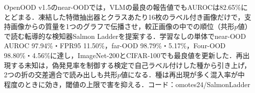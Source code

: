 OpenOOD v1.5のnear-OODでは，VLMの最良の報告値でもAUROCは82.65\%にとどまる．凍結した特徴抽出器とクラスあたり16枚のラベル付き画像だけで，支持画像からの質量を1つのグラフで伝播させ，較正画像の中での順位（共形$p$値）で読む転導的な検知器Salmon Ladderを提案する．学習なしの単体でnear-OOD AUROC 97.94\%・FPR95 11.50\%，far-OOD 98.79\%・5.17\%，Four-OOD 98.80\%・4.56\%に達し，ImageNet-200とCIFAR-100でも最良値を更新した．再出現する未知は，偽発見率を制御する検定で自己ラベル付けした種から引き上げ，2つの折の交差適合で読み出しも共形$p$値になる．種は再出現が多く混入率が中程度のときに効き，閾値の上限で害を抑える．コード：omotes24/SalmonLadder
